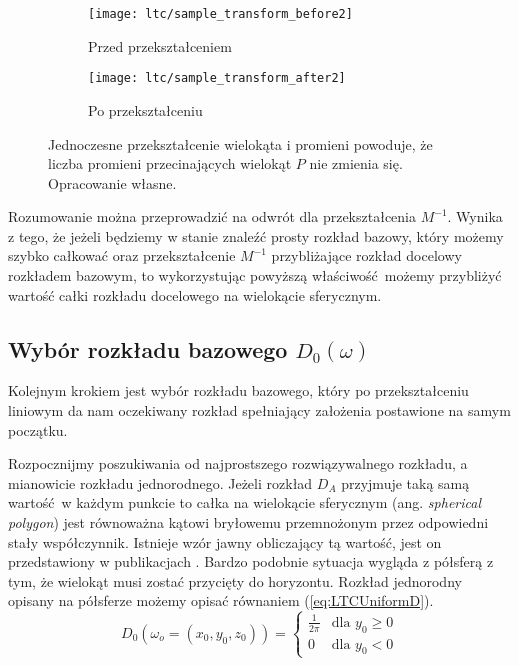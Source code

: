 \documentclass[../main.tex]{subfiles}
\begin{document}
\begin{figure}
    \centering
    \begin{subfigure}[t]{0.45\textwidth}
        \texttt{[image: ltc/sample\_transform\_before2]}
        \label{fig:LTCTransformBefore}
        \caption{Przed przekształceniem}
    \end{subfigure}
    \hspace{0.05\textwidth}
    \begin{subfigure}[t]{0.45\textwidth}
        \centering
        \texttt{[image: ltc/sample\_transform\_after2]}
        \label{fig:LTCTransformAfter}
        \caption{Po przekształceniu}
    \end{subfigure}
    
    \caption{Jednoczesne przekształcenie wielokąta i promieni powoduje, że liczba promieni przecinających wielokąt $P$ nie zmienia się. Opracowanie własne.}
    \label{fig:LTCTransformBeforeAfter}
\end{figure}

Rozumowanie można przeprowadzić na odwrót dla przekształcenia $M^{-1}$. Wynika z tego, że jeżeli będziemy w stanie znaleźć prosty rozkład bazowy, który możemy szybko całkować oraz przekształcenie $M^{-1}$ przybliżające rozkład docelowy rozkładem bazowym, to wykorzystując powyższą właściwość możemy przybliżyć wartość całki rozkładu docelowego na wielokącie sferycznym.


\subsection{Wybór rozkładu bazowego $D_0(\omega)$}

Kolejnym krokiem jest wybór rozkładu bazowego, który po przekształceniu liniowym da nam oczekiwany rozkład spełniający założenia postawione na samym początku.

Rozpocznijmy poszukiwania od najprostszego rozwiązywalnego rozkładu, a mianowicie rozkładu jednorodnego. Jeżeli rozkład $D_A$ przyjmuje taką samą wartość w każdym punkcie to całka na wielokącie sferycznym (ang. \textit{spherical polygon}) jest równoważna kątowi bryłowemu przemnożonym przez odpowiedni stały współczynnik. Istnieje wzór jawny obliczający tą wartość, jest on przedstawiony w publikacjach \cite{Arvo,Snyder}. Bardzo podobnie sytuacja wygląda z półsferą z tym, że wielokąt musi zostać przycięty do horyzontu. Rozkład jednorodny opisany na półsferze możemy opisać równaniem (\ref{eq:LTCUniformD}).
\begin{equation}
D_0(\omega_o=(x_0, y_0, z_0)) = \begin{cases}
  \frac{1}{2\pi} & \text{dla } y_0 \geq 0 \\
  0 & \text{dla } y_0 < 0
\end{cases}
\label{eq:LTCUniformD}
\end{equation}
\end{document}
